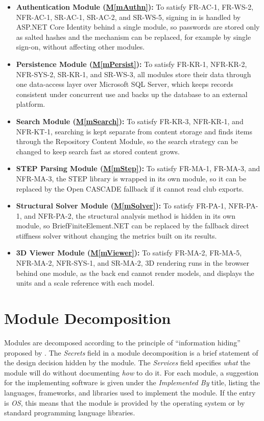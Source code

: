 \documentclass[12pt, titlepage]{article}
\newcommand{\mref}[1]{\hyperref[#1:dec]{M\ref*{#1}}}
\begin{document}
\begin{itemize}
\item \textbf{Authentication Module (\mref{mAuthn}):} To satisfy FR-AC-1, FR-WS-2, NFR-AC-1, SR-AC-1, SR-AC-2, and SR-WS-5, signing in is handled by ASP.NET Core Identity behind a single module, so passwords are stored only as salted hashes and the mechanism can be replaced, for example by single sign-on, without affecting other modules.
\item \textbf{Persistence Module (\mref{mPersist}):} To satisfy FR-KR-1, NFR-KR-2, NFR-SYS-2, SR-KR-1, and SR-WS-3, all modules store their data through one data-access layer over Microsoft SQL Server, which keeps records consistent under concurrent use and backs up the database to an external platform.
\item \textbf{Search Module (\mref{mSearch}):} To satisfy FR-KR-3, NFR-KR-1, and NFR-KT-1, searching is kept separate from content storage and finds items through the Repository Content Module, so the search strategy can be changed to keep search fast as stored content grows.
\item \textbf{STEP Parsing Module (\mref{mStep}):} To satisfy FR-MA-1, FR-MA-3, and NFR-MA-3, the STEP library is wrapped in its own module, so it can be replaced by the Open CASCADE fallback if it cannot read club exports.
\item \textbf{Structural Solver Module (\mref{mSolver}):} To satisfy FR-PA-1, NFR-PA-1, and NFR-PA-2, the structural analysis method is hidden in its own module, so BriefFiniteElement.NET can be replaced by the fallback direct stiffness solver without changing the metrics built on its results.
\item \textbf{3D Viewer Module (\mref{mViewer}):} To satisfy FR-MA-2, FR-MA-5, NFR-MA-2, NFR-SYS-1, and SR-MA-2, 3D rendering runs in the browser behind one module, as the back end cannot render models, and displays the units and a scale reference with each model.
\end{itemize}

\section{Module Decomposition} \label{SecMD}

Modules are decomposed according to the principle of ``information hiding''
proposed by \citet{ParnasEtAl1984}. The \emph{Secrets} field in a module
decomposition is a brief statement of the design decision hidden by the
module. The \emph{Services} field specifies \emph{what} the module will do
without documenting \emph{how} to do it. For each module, a suggestion for the
implementing software is given under the \emph{Implemented By} title, listing
the languages, frameworks, and libraries used to implement the module. If the
entry is \emph{OS}, this means that the module is provided by the operating
system or by standard programming language libraries.
\end{document}
